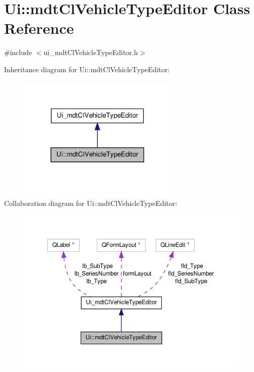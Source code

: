\hypertarget{class_ui_1_1mdt_cl_vehicle_type_editor}{\section{Ui\-:\-:mdt\-Cl\-Vehicle\-Type\-Editor Class Reference}
\label{class_ui_1_1mdt_cl_vehicle_type_editor}
}


{\ttfamily \#include $<$ui\-\_\-mdt\-Cl\-Vehicle\-Type\-Editor.\-h$>$}



Inheritance diagram for Ui\-:\-:mdt\-Cl\-Vehicle\-Type\-Editor\-:
\nopagebreak
\begin{figure}[H]
\begin{center}
\leavevmode
\includegraphics[width=218pt]{class_ui_1_1mdt_cl_vehicle_type_editor__inherit__graph}
\end{center}
\end{figure}


Collaboration diagram for Ui\-:\-:mdt\-Cl\-Vehicle\-Type\-Editor\-:
\nopagebreak
\begin{figure}[H]
\begin{center}
\leavevmode
\includegraphics[width=350pt]{class_ui_1_1mdt_cl_vehicle_type_editor__coll__graph}
\end{center}
\end{figure}
